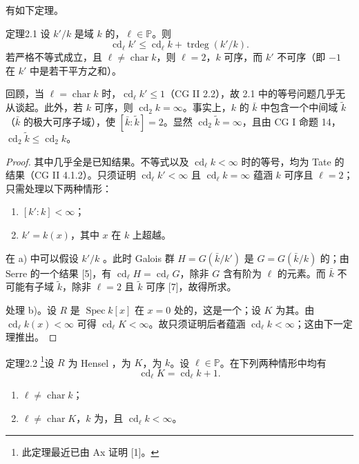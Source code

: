 有如下定理。
\begin{SGAresult}{定理}{2.1}
设 $k'/k$ 是域 $k$ 的，$\ell\in\mathbb P$。则
\[
 \operatorname{cd}_\ell k'\leq\operatorname{cd}_\ell k+\operatorname{trdeg}(k'/k).
\]
若严格不等式成立，且 $\ell\ne\operatorname{char}k$，则 $\ell=2$，$k$ 可序，而 $k'$ 不可序（即 $-1$ 在 $k'$ 中是若干平方之和）。
\end{SGAresult}
回顾，当 $\ell=\operatorname{char}k$ 时，$\operatorname{cd}_\ell k'\leq1$（CG II 2.2），故 2.1 中的等号问题几乎无从谈起。此外，若 $k$ 可序，则 $\operatorname{cd}_2k=\infty$。事实上，$k$ 的 $\bar k$ 中包含一个中间域 $\widetilde k$（$\bar k$ 的极大可序子域），使 $[\bar k:\widetilde k]=2$。显然 $\operatorname{cd}_2\widetilde k=\infty$，且由 CG I 命题 14，$\operatorname{cd}_2\widetilde k\leq\operatorname{cd}_2k$。
\begin{proof}
其中几乎全是已知结果。不等式以及 $\operatorname{cd}_\ell k<\infty$ 时的等号，均为 Tate 的结果（CG II 4.1.2）。只须证明 $\operatorname{cd}_\ell k'<\infty$ 且 $\operatorname{cd}_\ell k=\infty$ 蕴涵 $k$ 可序且 $\ell=2$；只需处理以下两种情形：
\begin{enumerate}
\item[a)] $[k':k]<\infty$；
\item[b)] $k'=k(x)$，其中 $x$ 在 $k$ 上超越。
\end{enumerate}
在 a) 中可以假设 $k'/k$ 。此时 Galois 群 $H=G(\bar k/k')$ 是 $G=G(\bar k/k)$ 的；由 Serre 的一个结果 [5]，有 $\operatorname{cd}_\ell H=\operatorname{cd}_\ell G$，除非 $G$ 含有阶为 $\ell$ 的元素。而 $\bar k$ 不可能有子域 $\widetilde k$，除非 $\ell=2$ 且 $\widetilde k$ 可序 [7]，故得所求。

处理 b)。设 $R$ 是 $\operatorname{Spec}k[x]$ 在 $x=0$ 处的，这是一个；设 $K$ 为其。由 $\operatorname{cd}_\ell k(x)<\infty$ 可得 $\operatorname{cd}_\ell K<\infty$。故只须证明后者蕴涵 $\operatorname{cd}_\ell k<\infty$；这由下一定理推出。
\end{proof}
\begin{SGAresult}{定理}{2.2}
\footnote{此定理最近已由 Ax 证明 [1]。}设 $R$ 为 Hensel ，为 $K$，为 $k$。设 $\ell\in\mathbb P$。在下列两种情形中均有
\[
 \operatorname{cd}_\ell K=\operatorname{cd}_\ell k+1.
\]
\begin{enumerate}
\item[(i)] $\ell\ne\operatorname{char}k$；
\item[(ii)] $\ell\ne\operatorname{char}K$，$k$ 为，且 $\operatorname{cd}_\ell k<\infty$。
\end{enumerate}
\end{SGAresult}

